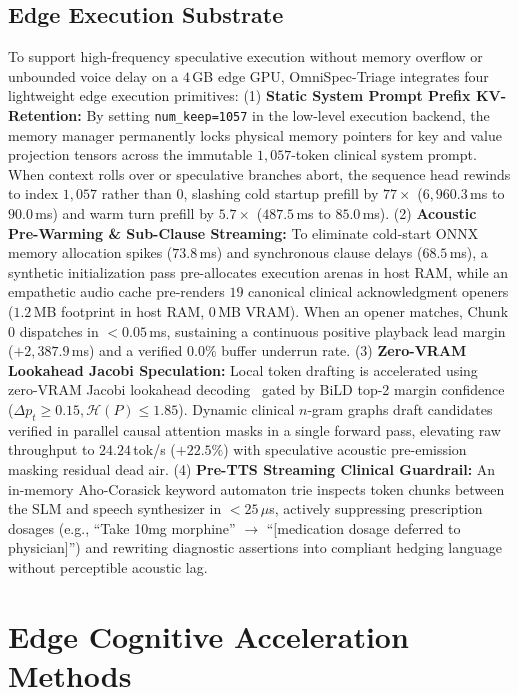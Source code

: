 \documentclass[10pt,journal,compsoc]{IEEEtran}
\begin{document}
\subsection{Edge Execution Substrate}
To support high-frequency speculative execution without memory overflow or unbounded voice delay on a $4$\,GB edge GPU, OmniSpec-Triage integrates four lightweight edge execution primitives:
(1) \textbf{Static System Prompt Prefix KV-Retention:} By setting \texttt{num\_keep=1057} in the low-level execution backend, the memory manager permanently locks physical memory pointers for key and value projection tensors across the immutable $1{,}057$-token clinical system prompt. When context rolls over or speculative branches abort, the sequence head rewinds to index $1{,}057$ rather than $0$, slashing cold startup prefill by $77\times$ ($6{,}960.3$\,ms to $90.0$\,ms) and warm turn prefill by $5.7\times$ ($487.5$\,ms to $85.0$\,ms).
(2) \textbf{Acoustic Pre-Warming \& Sub-Clause Streaming:} To eliminate cold-start ONNX memory allocation spikes ($73.8$\,ms) and synchronous clause delays ($68.5$\,ms), a synthetic initialization pass pre-allocates execution arenas in host RAM, while an empathetic audio cache pre-renders $19$ canonical clinical acknowledgment openers ($1.2$\,MB footprint in host RAM, $0$\,MB VRAM). When an opener matches, Chunk 0 dispatches in $<0.05$\,ms, sustaining a continuous positive playback lead margin ($+2{,}387.9$\,ms) and a verified $0.0\%$ buffer underrun rate.
(3) \textbf{Zero-VRAM Lookahead Jacobi Speculation:} Local token drafting is accelerated using zero-VRAM Jacobi lookahead decoding~\cite{fu2024lookahead} gated by BiLD top-2 margin confidence~\cite{bild2023} ($\Delta p_t \ge 0.15, \mathcal{H}(P) \le 1.85$). Dynamic clinical $n$-gram graphs draft candidates verified in parallel causal attention masks in a single forward pass, elevating raw throughput to $24.24$\,tok/s ($+22.5\%$) with speculative acoustic pre-emission masking residual dead air.
(4) \textbf{Pre-TTS Streaming Clinical Guardrail:} An in-memory Aho-Corasick keyword automaton trie inspects token chunks between the SLM and speech synthesizer in $<25\,\mu$s, actively suppressing prescription dosages (e.g., ``Take 10mg morphine'' $\to$ ``[medication dosage deferred to physician]'') and rewriting diagnostic assertions into compliant hedging language without perceptible acoustic lag.

\section{Edge Cognitive Acceleration Methods}
\label{sec:optimizations}
\end{document}
